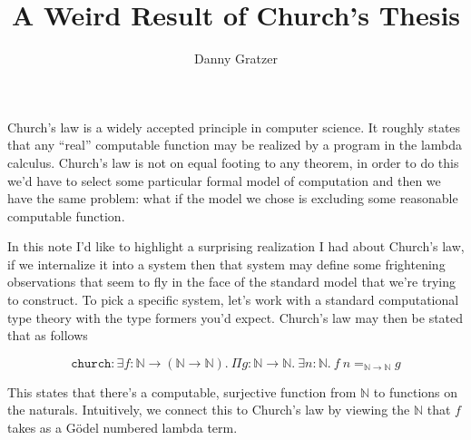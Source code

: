 \documentclass{amsart}
\title{A Weird Result of Church's Thesis}
\author{Danny Gratzer}
\newcommand{\nat}{\mathbb{N}}
\begin{document}
\maketitle

Church's law is a widely accepted principle in computer science. It
roughly states that any ``real'' computable function may be realized
by a program in the lambda calculus. Church's law is not on equal
footing to any theorem, in order to do this we'd have to select some
particular formal model of computation and then we have the same
problem: what if the model we chose is excluding some reasonable
computable function.

In this note I'd like to highlight a surprising realization I had
about Church's law, if we internalize it into a system then that
system may define some frightening observations that seem to fly in
the face of the standard model that we're trying to construct. To pick
a specific system, let's work with a standard computational type
theory with the type formers you'd expect. Church's law may then be
stated that as follows

\[
  \mathtt{church} :
  \exists f : \nat \to (\nat \to \nat).
  \ \Pi g : \nat \to \nat.
  \ \exists n : \nat.
  \ f\ n =_{\nat \to \nat} g
\]

This states that there's a computable, surjective function from $\nat$
to functions on the naturals. Intuitively, we connect this to Church's
law by viewing the $\nat$ that $f$ takes as a G\"odel numbered
lambda term.
\end{document}
